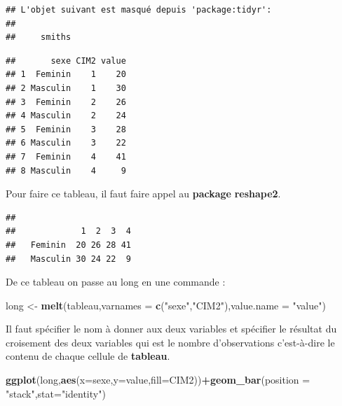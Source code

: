 \documentclass[
]{book}
\newenvironment{Shaded}{\begin{snugshade}}{\end{snugshade}}
\newcommand{\AttributeTok}[1]{\textcolor[rgb]{0.13,0.29,0.53}{#1}}
\newcommand{\FunctionTok}[1]{\textcolor[rgb]{0.13,0.29,0.53}{\textbf{#1}}}
\newcommand{\NormalTok}[1]{#1}
\newcommand{\OtherTok}[1]{\textcolor[rgb]{0.56,0.35,0.01}{#1}}
\newcommand{\SpecialCharTok}[1]{\textcolor[rgb]{0.81,0.36,0.00}{\textbf{#1}}}
\newcommand{\StringTok}[1]{\textcolor[rgb]{0.31,0.60,0.02}{#1}}
\begin{document}
\begin{verbatim}
## L'objet suivant est masqué depuis 'package:tidyr':
## 
##     smiths
\end{verbatim}

\begin{verbatim}
##       sexe CIM2 value
## 1  Feminin    1    20
## 2 Masculin    1    30
## 3  Feminin    2    26
## 4 Masculin    2    24
## 5  Feminin    3    28
## 6 Masculin    3    22
## 7  Feminin    4    41
## 8 Masculin    4     9
\end{verbatim}

Pour faire ce tableau, il faut faire appel au \textbf{package} \textbf{reshape2}.

\begin{Shaded}
\end{Shaded}

\begin{verbatim}
##           
##             1  2  3  4
##   Feminin  20 26 28 41
##   Masculin 30 24 22  9
\end{verbatim}

De ce tableau on passe au long en une commande :

\begin{Shaded}
\begin{Highlighting}[]
\NormalTok{long }\OtherTok{\textless{}{-}} \FunctionTok{melt}\NormalTok{(tableau,}\AttributeTok{varnames =} \FunctionTok{c}\NormalTok{(}\StringTok{"sexe"}\NormalTok{,}\StringTok{"CIM2"}\NormalTok{),}\AttributeTok{value.name =} \StringTok{"value"}\NormalTok{)}
\end{Highlighting}
\end{Shaded}

Il faut spécifier le nom à donner aux deux variables et spécifier le résultat
du croisement des deux variables qui est le nombre d'observations c'est-à-dire
le contenu de chaque cellule de \textbf{tableau}.

\begin{Shaded}
\begin{Highlighting}[]
\FunctionTok{ggplot}\NormalTok{(long,}\FunctionTok{aes}\NormalTok{(}\AttributeTok{x=}\NormalTok{sexe,}\AttributeTok{y=}\NormalTok{value,}\AttributeTok{fill=}\NormalTok{CIM2))}\SpecialCharTok{+}\FunctionTok{geom\_bar}\NormalTok{(}\AttributeTok{position =} \StringTok{"stack"}\NormalTok{,}\AttributeTok{stat=}\StringTok{"identity"}\NormalTok{)}
\end{Highlighting}
\end{Shaded}
\end{document}
